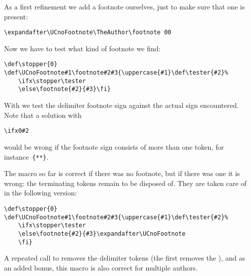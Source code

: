 \documentclass[letterpaper]{book}
\begin{document}
As a first refinement we add a footnote ourselves, just to make
sure that one is present:
\begin{verbatim}
\expandafter\UCnoFootnote\TheAuthor\footnote 00
\end{verbatim}
Now we have to test what kind of footnote we find:
\begin{verbatim}
\def\stopper{0}
\def\UCnoFootnote#1\footnote#2#3{\uppercase{#1}\def\tester{#2}%
    \ifx\stopper\tester
    \else\footnote{#2}{#3}\fi}
\end{verbatim}
With  we test the delimiter footnote sign against the
actual sign encountered. Note that a solution with
\begin{verbatim}
\ifx0#2
\end{verbatim}
would be wrong if the footnote sign consists
of more than one token, for instance~\verb>{**}>.

The macro so far is correct if there was no footnote,
but if there was one it is wrong:
the terminating tokens remain to be disposed of.
They are taken care of in the following version:
\begin{verbatim}
\def\stopper{0}
\def\UCnoFootnote#1\footnote#2#3{\uppercase{#1}\def\tester{#2}%
    \ifx\stopper\tester
    \else\footnote{#2}{#3}\expandafter\UCnoFootnote
    \fi}
\end{verbatim}
A repeated call to  removes the delimiter tokens
(the  first removes the ),
and as an added bonus, this macro is also correct for multiple
authors.
\end{document}
